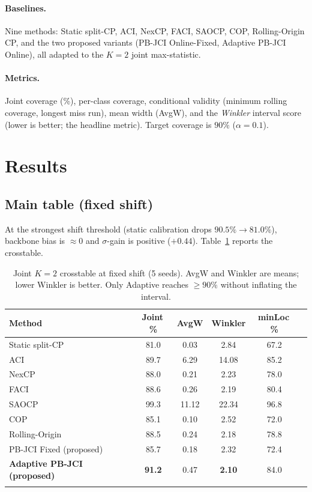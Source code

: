 \documentclass[pdflatex,sn-mathphys-num]{sn-jnl}%
\begin{document}
\paragraph{Baselines.} Nine methods: Static split-CP, ACI, NexCP, FACI, SAOCP, COP, Rolling-Origin CP, and
the two proposed variants (PB-JCI Online-Fixed, Adaptive PB-JCI Online), all adapted to the $K{=}2$ joint
max-statistic.

\paragraph{Metrics.} Joint coverage (\%), per-class coverage, conditional validity (minimum rolling
coverage, longest miss run), mean width (AvgW), and the \emph{Winkler} interval score (lower is better; the
headline metric). Target coverage is $90\%$ ($\alpha=0.1$).

\section{Results}\label{sec:results}

\subsection{Main table (fixed shift)}
At the strongest shift threshold (static calibration drops $90.5\%\!\to\!81.0\%$), backbone bias is
$\approx 0$ and $\sigma$-gain is positive ($+0.44$). Table~\ref{tab:main} reports the crosstable.

\begin{table}[h]
\caption{Joint $K{=}2$ crosstable at fixed shift (5 seeds). AvgW and Winkler are means; lower Winkler is
better. Only Adaptive reaches $\ge 90\%$ without inflating the interval.}\label{tab:main}
\begin{tabular}{@{}lccccc@{}}
\toprule
Method & Joint\,\% & AvgW & Winkler & minLoc\,\% \\
\midrule
Static split-CP & 81.0 & 0.03 & 2.84 & 67.2 \\
ACI~\cite{gibbs2021} & 89.7 & 6.29 & 14.08 & 85.2 \\
NexCP~\cite{barber2023} & 88.0 & 0.21 & 2.23 & 78.0 \\
FACI~\cite{gibbs2024} & 88.6 & 0.26 & 2.19 & 80.4 \\
SAOCP~\cite{bhatnagar2023} & 99.3 & 11.12 & 22.34 & 96.8 \\
COP & 85.1 & 0.10 & 2.52 & 72.0 \\
Rolling-Origin & 88.5 & 0.24 & 2.18 & 78.8 \\
PB-JCI Fixed (proposed) & 85.7 & 0.18 & 2.32 & 72.4 \\
\textbf{Adaptive PB-JCI (proposed)} & \textbf{91.2} & 0.47 & \textbf{2.10} & 84.0 \\
\botrule
\end{tabular}
\end{table}
\end{document}
